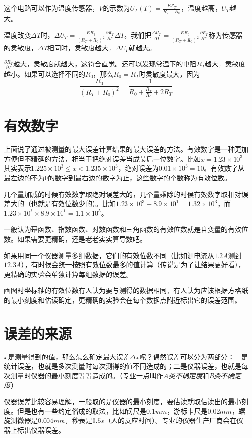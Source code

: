 这个电路可以作为温度传感器，$V$的示数为$U_T(T)=\frac{E R_T}{R_T+R_0}$，温度越高，$U_T$越大。

温度改变$\Delta T$时，$\Delta U_T=\frac{E R_0}{(R_T+R_0)^2} \frac{\partial R_T}{\partial T} \Delta T$。我们把$\frac{\Delta U_T}{\Delta T}=\frac{E R_0}{(R_T+R_0)^2} \frac{\partial R_T}{\partial T}$称为传感器的灵敏度，$\Delta T$相同时，灵敏度越大，$\Delta U_T$就越大。

$\frac{\partial R_T}{\partial T}$越大，灵敏度就越大，这符合直觉。还可以发现常温下的电阻$R_T$越大，灵敏度越小。如果可以选择不同的$R_0$，那么$R_0=R_T$时灵敏度最大，因为
\begin{equation*}
\frac{R_0}{(R_T+R_0)^2}=\frac{1}{R_0+\frac{R_T}{R_0}+2 R_T}
\end{equation*}
\section{有效数字}
上面说了通过被测量的最大误差计算结果的最大误差的方法。有效数字是一种更加方便但不精确的方法，相当于把绝对误差当成最后一位数字。比如$x=1.23 \times 10^3$其实表示$1.225 \times 10^3 \le x <1.235 \times 10^3$，绝对误差为$0.01 \times 10^3=10$。有效数字从最左边的不为$0$的数字到最右边的数字为止，这些数字的个数称为有效位数。

几个量加减的时候有效数字取绝对误差大的，几个量乘除的时候有效数字取相对误差大的（也就是有效位数少的）。比如$1.23 \times 10^3+8.9 \times 10^1=1.32 \times 10^3$，而$1.23 \times 10^3 \times 8.9 \times 10^1=1.1 \times 10^5$。

一般认为幂函数、指数函数、对数函数和三角函数的有效位数就是自变量的有效位数。如果需要更精确，还是老老实实算导数吧。

如果用同一个仪器测量多组数据，它们的有效位数不同（比如测电流从$1.2 \unit{A}$测到$12.3 \unit{A}$），有时候会统一按照有效位数最多的值计算（传说是为了让结果更好看），更精确的实验会单独计算每组数据的误差。

画图时坐标轴的有效位数有人认为要与测得的数据相同，有人认为应该根据方格纸的最小刻度和估读确定，更精确的实验会在每个数据点附近标出它的误差范围。
\section{误差的来源}
$x$是测量得到的值，那么怎么确定最大误差$\Delta x$呢？偶然误差可以分为两部分：一是统计误差，也就是多次测量时每次测得的值不同造成的；二是仪器误差，也就是每次测量时仪器的最小刻度等等造成的。（专业一点叫作\emph{A类不确定度}和\emph{B类不确定度}）

仪器误差比较容易理解，一般取的是仪器的最小刻度，要估读就取估读出的最小刻度。但是也有一些约定俗成的取法，比如钢尺是$0.1 \unit{mm}$，游标卡尺是$0.02 \unit{mm}$，螺旋测微器是$0.004 \unit{mm}$，秒表是$0.5 \unit{s}$（人的反应时间）。专业的仪器生产厂商会在仪器上标出仪器误差。


